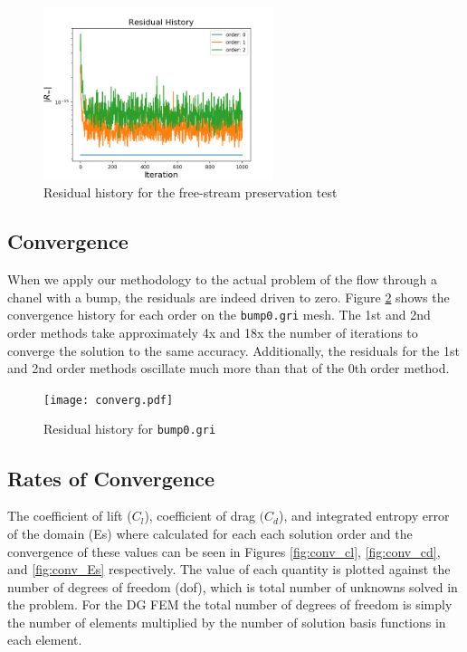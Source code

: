 \documentclass{article}
\begin{document}
\begin{figure}[H]
	\centering
	\includegraphics[width=0.60\textwidth,keepaspectratio]{freestream.png}
	\caption{Residual history for the free-stream preservation test}
	\label{fig:free_stream}
\end{figure}





\subsection{Convergence}

When we apply our methodology to the actual problem of the flow through a chanel with a bump, the residuals are indeed driven to zero.
Figure \ref{fig:res_history} shows the convergence history for each order on the \texttt{bump0.gri} mesh.
The 1st and 2nd order methods take approximately 4x and 18x the number of iterations to converge the solution to the same accuracy.
Additionally, the residuals for the 1st and 2nd order methods oscillate much more than that of the 0th order method.



\begin{figure}[H]
	\centering
	\texttt{[image: converg.pdf]}
	\caption{Residual history for \texttt{bump0.gri}}
	\label{fig:res_history}
\end{figure}

\subsection{Rates of Convergence}

The coefficient of lift ($C_l$), coefficient of drag $(C_d$), and integrated entropy error of the domain (Es) where calculated for each each solution order and the convergence of these values can be seen in Figures \ref{fig:conv_cl}, \ref{fig:conv_cd}, and \ref{fig:conv_Es} respectively.
The value of each quantity is plotted against the number of degrees of freedom (dof), which is total number of unknowns solved in the problem.
For the DG FEM the total number of degrees of freedom is simply the number of elements multiplied by the number of solution basis functions in each element.
\end{document}
